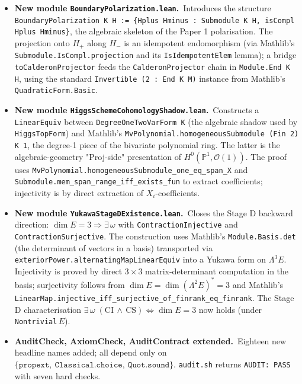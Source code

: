 \begin{itemize}[leftmargin=1.6em, itemsep=2pt]
\item \textbf{New module \texttt{BoundaryPolarization.lean}.}\
    Introduces the structure
    \texttt{BoundaryPolarization K H := \{Hplus Hminus :
    Submodule K H, isCompl Hplus Hminus\}}, the algebraic
    skeleton of the Paper 1 polarisation. The projection
    onto $H_+$ along $H_-$ is an idempotent endomorphism
    (via Mathlib's \texttt{Submodule.IsCompl.projection} and
    its \texttt{IsIdempotentElem} lemma); a bridge
    \texttt{toCalderonProjector} feeds the
    \texttt{CalderonProjector} chain in
    \texttt{Module.End K H}, using the standard
    \texttt{Invertible (2 : \texttt{End} K M)} instance from
    Mathlib's \texttt{QuadraticForm.Basic}.

\item \textbf{New module \texttt{HiggsSchemeCohomologyShadow.lean}.}\
    Constructs a \texttt{LinearEquiv} between
    \texttt{DegreeOneTwoVarForm K} (the algebraic shadow used
    by \texttt{HiggsTopForm}) and Mathlib's
    \texttt{MvPolynomial.homogeneousSubmodule (Fin 2) K 1}, the
    degree-1 piece of the bivariate polynomial ring. The latter
    is the algebraic-geometry "Proj-side" presentation of
    $H^0(\mathbb P^1, \mathcal O(1))$. The proof uses
    \texttt{MvPolynomial.homogeneousSubmodule\_one\_eq\_span\_X}
    and \texttt{Submodule.mem\_span\_range\_iff\_exists\_fun}
    to extract coefficients; injectivity is by direct
    extraction of $X_i$-coefficients.

\item \textbf{New module \texttt{YukawaStageDExistence.lean}.}\
    Closes the Stage D backward direction:
    $\dim E = 3 \Rightarrow \exists\,\omega$ with
    \texttt{ContractionInjective} and
    \texttt{ContractionSurjective}. The construction uses
    Mathlib's \texttt{Module.Basis.det} (the determinant of
    vectors in a basis) transported via
    \texttt{exteriorPower.alternatingMapLinearEquiv} into a
    Yukawa form on $\Lambda^3 E$. Injectivity is proved by
    direct $3\times 3$ matrix-determinant computation in
    the basis; surjectivity follows from
    $\dim E = \dim(\Lambda^2 E)^* = 3$ and Mathlib's
    \texttt{LinearMap.injective\_iff\_surjective\_of\_finrank\_eq\_finrank}.
    The Stage D characterisation
    $\exists\,\omega\;(\textrm{CI}\,\wedge\,\textrm{CS})
      \iff \dim E = 3$ now holds (under
    \texttt{Nontrivial}\,$E$).

\item \textbf{AuditCheck, AxiomCheck, AuditContract extended.}\
    Eighteen new headline names added; all depend only on
    $\{\texttt{propext},\ \texttt{Classical.choice},\
    \texttt{Quot.sound}\}$. \texttt{audit.sh} returns
    \texttt{AUDIT:\ PASS} with seven hard checks.
\end{itemize}

